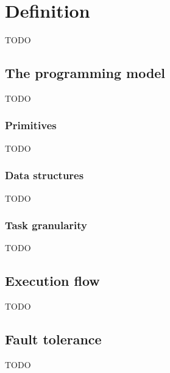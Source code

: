 \section{Definition}
TODO

\subsection{The programming model}
TODO

\subsubsection{Primitives}
TODO

\subsubsection{Data structures}
TODO

\subsubsection{Task granularity}
TODO

\subsection{Execution flow}
TODO

\subsection{Fault tolerance}
TODO
